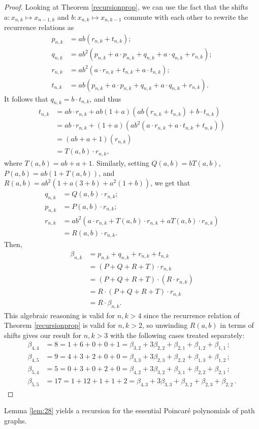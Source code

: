 \documentclass[12pt]{amsart}
\theoremstyle{definition}
\begin{document}
\begin{proof}
    Looking at Theorem \ref{recursionprop}, we can use the fact that the shifts $a \colon x_{n,k} \mapsto x_{n-1,k}$ and $b \colon x_{n,k} \mapsto x_{n,k-1}$ commute with each other to rewrite the recurrence relations as 
    \begin{align*}
    p_{n,k} &= ab(r_{n,k}+t_{n,k});\\
    q_{n,k} &= ab^2(p_{n,k}+a\cdot p_{n,k} + q_{n,k} + a\cdot q_{n,k}+ r_{n,k});\\
    r_{n,k} &= ab^2(a \cdot r_{n,k} + t_{n,k} + a \cdot t_{n,k});\\
    t_{n,k} &= ab (p_{n,k}+a \cdot p_{n,k} + q_{n,k} + a\cdot q_{n,k} + r_{n,k}).
    \end{align*}
    It follows that $q_{n,k} = b \cdot t_{n,k}$, and thus 
    \begin{align*}
    t_{n,k}  &= ab \cdot r_{n,k} + ab(1+a)(ab(r_{n,k}+t_{n,k}) + b\cdot t_{n,k}) \\
    &= ab \cdot r_{n,k} + (1+a)(ab^2(a \cdot r_{n,k} + a \cdot t_{n,k} + t_{n,k})) \\
    &= (ab+a + 1)(r_{n,k})\\ 
    &= T(a,b) \cdot r_{n,k},
    \end{align*} 
    where $T(a,b)=ab+a+1$. Similarly, setting $Q(a,b)=bT(a,b)$, $P(a,b)=ab(1+T(a,b))$, and $R(a,b)=ab^2(1+a(3+b)+a^2(1+b))$, we get that 
    \begin{align*}
q_{n,k} & = Q(a,b)\cdot r_{n,k};\\
p_{n,k} & = P(a,b) \cdot r_{n,k};\\
r_{n,k} & = ab^2(a\cdot r_{n,k}+T(a,b)\cdot r_{n,k}+aT(a,b)\cdot r_{n,k})\\
& = R(a,b) \cdot r_{n,k}.
    \end{align*}
    Then,
\begin{align*}    
    \beta_{n,k} &= p_{n,k}+q_{n,k}+r_{n,k}+t_{n,k}\\
    &= (P+Q+R+T)\cdot r_{n,k} \\
    &= (P+Q+R+T)\cdot (R\cdot r_{n,k}) \\
    &= R\cdot (P+Q+R+T)\cdot r_{n,k} \\
    &= R \cdot \beta_{n,k}.
\end{align*}
This algebraic reasoning is valid for $n,k > 4$ since the recurrence relation of Theorem \ref{recursionprop} is valid for $n,k >2$, so unwinding $R(a,b)$ in terms of shifts gives our result for $n,k> 3$ with the following cases treated separately:
\begin{align*}
\beta_{4,4}&=8= 1 + 6 + 0 + 0 + 1=\beta_{3,2} + 3\beta_{2,2} + \beta_{2,1} + \beta_{1,2} + \beta_{1,1}\,; \\
\beta_{4,5}&=9=4 + 3 + 2 + 0 + 0=\beta_{3,3}+3\beta_{2,3}+ \beta_{2,2}+\beta_{1,3}+\beta_{1,2}\,;\\
\beta_{5,4}&=5=0+3 + 0+2 +0=\beta_{4,2}+3 \beta_{3,2}+\beta_{3,1}+\beta_{2,2}+\beta_{2,1}\,;\\
\beta_{5,5}&= 17= 1+12+1+1+2=\beta_{4,3}+3\beta_{3,3}+\beta_{3,2}+\beta_{2,3}+\beta_{2,2}\,.
\end{align*}
\end{proof}
Lemma \ref{lem:28} yields a recursion for the essential Poincar{\'e} polynomials of path graphs.
\end{document}
